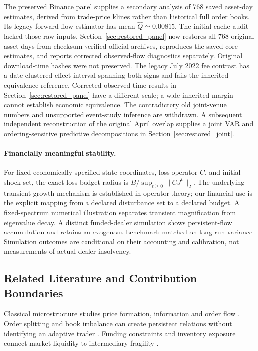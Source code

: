 \documentclass[12pt]{article}
\theoremstyle{definition}
\theoremstyle{remark}
\begin{document}
The preserved Binance panel supplies a secondary analysis of 768 saved asset-day estimates, derived from trade-price klines rather than historical full order books. Its legacy forward-flow estimator has mean $\hat Q\simeq0.00815$. The initial cache audit lacked those raw inputs. Section~\ref{sec:restored_panel} now restores all 768 original asset-days from checksum-verified official archives, reproduces the saved core estimates, and reports corrected observed-flow diagnostics separately. Original download-time hashes were not preserved. The legacy July 2022 fee contrast has a date-clustered effect interval spanning both signs and fails the inherited equivalence reference. Corrected observed-time results in Section~\ref{sec:restored_panel} have a different scale; a wide inherited margin cannot establish economic equivalence. The contradictory old joint-venue numbers and unsupported event-study inference are withdrawn. A subsequent independent reconstruction of the original April overlap supplies a joint VAR and ordering-sensitive predictive decompositions in Section~\ref{sec:restored_joint}.

\paragraph{Financially meaningful stability.}
For fixed economically specified state coordinates, loss operator $C$, and initial-shock set, the exact loss-budget radius is $B/\sup_{t\ge0}\|CJ^t\|_2$. The underlying transient-growth mechanism is established in operator theory; our financial use is the explicit mapping from a declared disturbance set to a declared budget. A fixed-spectrum numerical illustration separates transient magnification from eigenvalue decay. A distinct funded-dealer simulation shows persistent-flow accumulation and retains an exogenous benchmark matched on long-run variance. Simulation outcomes are conditional on their accounting and calibration, not measurements of actual dealer insolvency.

\subsection{Related Literature and Contribution Boundaries}
Classical microstructure studies price formation, information and order flow \citep{kyle1985continuous,glosten1985bid,hasbrouck1991}. Order splitting and book imbalance can create persistent relations without identifying an adaptive trader \citep{bouchaud2004fluctuations,cont2014}. Funding constraints and inventory exposure connect market liquidity to intermediary fragility \citep{brunnermeier2009,adrian2010liquidity,greenwood2015vulnerable}.
\end{document}
